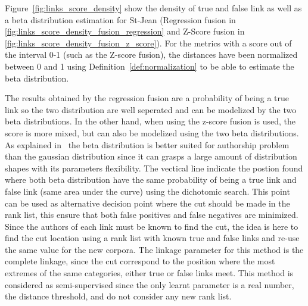 Figure~\ref{fig:links_score_density} show the density of true and false link as well as a beta distribution estimation for St-Jean (Regression fusion in \ref{fig:links_score_density_fusion_regression} and Z-Score fusion in \ref{fig:links_score_density_fusion_z_score}).
For the metrics with a score out of the interval 0-1 (such as the Z-score fusion), the distances have been normalized between 0 and 1 using Definition~\ref{def:normalization} to be able to estimate the beta distribution.

The results obtained by the regression fusion are a probability of being a true link so the two distribution are well seperated and can be modelized by the two beta distributions.
In the other hand, when using the z-score fusion is used, the score is more mixed, but can also be modelized using the two beta distributions.
As explained in~\cite{savoy_probability} the beta distribution is better suited for authorship problem than the gaussian distribution since it can grasps a large amount of distribution shapes with its parameters flexibility.
The vectical line indicate the postion found where both beta distribution have the same probability of being a true link and false link (same area under the curve) using the dichotomic search.
This point can be used as alternative decision point where the cut should be made in the rank list, this ensure that both false positives and false negatives are minimized.
Since the authors of each link must be known to find the cut, the idea is here to find the cut location using a rank list with known true and false links and re-use the same value for the new corpora.
The linkage parameter for this method is the complete linkage, since the cut correspond to the position where the most extremes of the same categories, either true or false links meet.
This method is considered as semi-supervised since the only learnt parameter is a real number, the distance threshold, and do not consider any new rank list.

